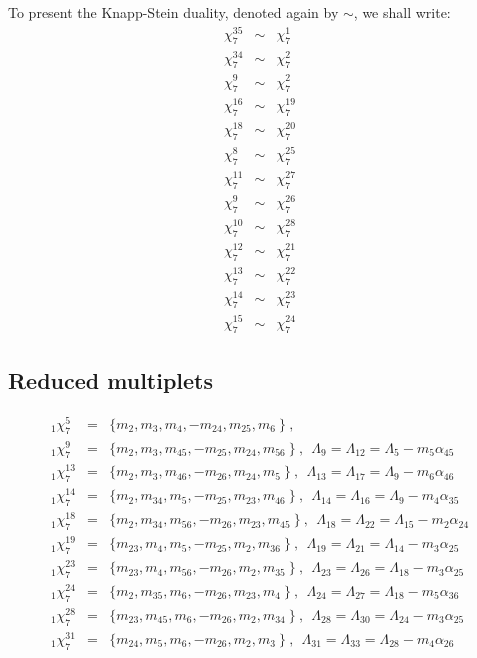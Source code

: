 \documentclass[a4paper]{jpconf}
\def\np{\newpage}
\def\bb {\begin {eqnarray}}
\def\eqnn#1{\bb\label{#1}}
\def\eea {\end {eqnarray}}
\def\nn{\nonumber}
\def\np{\vfill\eject}
\def\a{\alpha}
\def\L{\Lambda}
\begin{document}
To present the Knapp-Stein duality, denoted again by $\sim$, we shall write:
\eqnn{slt7d} \chi^{35}_7 &\sim&  {\chi}^1_7 \\
\chi^{34}_7 &\sim&  {\chi}^2_7 \nn\\
\chi^9_7 &\sim&  {\chi}^2_7 \nn\\
%
\chi^{16}_7 &\sim& \chi^{19}_7 \nn\\
\chi^{18}_7 &\sim& \chi^{20}_7 \nn\\
%
\chi^{8}_7 &\sim& \chi^{25}_7 \nn\\
\chi^{11}_7 &\sim& \chi^{27}_7 \nn\\
%
\chi^{9}_7 &\sim& \chi^{26}_7\nn\\
\chi^{10}_7 &\sim& \chi^{28}_7 \nn\\
%
 \chi^{12}_7 &\sim& \chi^{21}_7 \nn\\
\chi^{13}_7 &\sim& \chi^{22}_7 \nn\\
%
\chi^{14}_7 &\sim& \chi^{23}_7\nn\\
\chi^{15}_7 &\sim& \chi^{24}_7 \nn\eea

\subsection{Reduced multiplets}

\eqnn{slt71}
   _1\chi^5_7 &=& \{ m_{2}, m_{3}, m_{4}, -m_{24}, m_{25}, m_6 \   \} \ ,~ \\ %
 _1\chi^9_7 &=& \{ m_{2}, m_{3}, m_{45}, -m_{25}, m_{24}, m_{56} \   \} \ ,~~\L_9 = \L_{12} =\L_5 - m_5 \a_{45} \nn\\ %
  _1\chi^{13}_7 &=& \{ m_{2}, m_{3}, m_{46}, -m_{26}, m_{24}, m_{5} \   \} \ ,~~\L_{13} = \L_{17} = \L_9 - m_6 \a_{46} \nn\\ %
_1\chi^{14}_7 &=& \{ m_{2}, m_{34}, m_{5}, -m_{25}, m_{23}, m_{46} \   \} \ ,~~\L_{14} = \L_{16} =\L_9 - m_4 \a_{35} \nn\\ %
   _1\chi^{18}_7 &=& \{ m_{2}, m_{34}, m_{56}, -m_{26}, m_{23}, m_{45} \   \} \ ,~~\L_{18} = \L_{22} = \L_{15} - m_2 \a_{24}  \nn\\ %
_1\chi^{19}_7 &=& \{ m_{23}, m_{4}, m_{5}, -m_{25}, m_{2}, m_{36} \   \} \ ,~~\L_{19} = \L_{21} = \L_{14} - m_3 \a_{25} \nn\\ %
 _1\chi^{23}_7 &=& \{ m_{23}, m_{4}, m_{56}, -m_{26}, m_{2}, m_{35} \   \} \ ,~~\L_{23} = \L_{26} = \L_{18} - m_3 \a_{25}  \nn\\ %
_1\chi^{24}_7 &=& \{ m_{2}, m_{35}, m_{6}, -m_{26}, m_{23}, m_{4} \   \} \ ,~~\L_{24} = \L_{27} = \L_{18} - m_5 \a_{36}  \nn\\ %
   _1\chi^{28}_7 &=& \{ m_{23}, m_{45}, m_{6}, -m_{26}, m_{2}, m_{34} \   \} \ ,~~\L_{28} = \L_{30} = \L_{24} - m_3 \a_{25}  \nn\\ %
  _1\chi^{31}_7 &=& \{ m_{24}, m_{5}, m_{6}, -m_{26}, m_{2}, m_{3} \   \} \ ,~~\L_{31} = \L_{33} = \L_{28} - m_4 \a_{26}   %
   \nn\eea %
\end{document}
